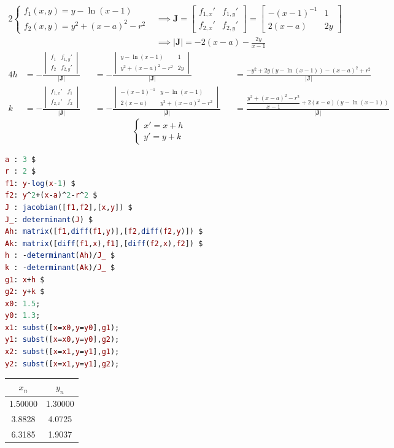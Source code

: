 \begin{alignat*}{2}
	\begin{cases}
		f_1(x,y)=y-\ln(x-1)\\
		f_2(x,y)=y^2+(x-a)^2-r^2
	\end{cases}
	&\implies
	\mathbf{J}=\begin{bmatrix}
  		f_{1,x}' & f_{1,y}'\\
  		f_{2,x}' & f_{2,y}'
	\end{bmatrix}=\begin{bmatrix}
  		-(x-1)^{-1} & 1\\
  		2(x-a)      & 2y
	\end{bmatrix}\\
	&\implies
	|\mathbf{J}|=-2(x-a)-\frac{2y}{x-1}
\end{alignat*}
\begin{alignat*}{4}
	h&=-\frac{
		\begin{vmatrix}
			f_1 & f_{1,y}' \\
			f_2 & f_{2,y}'
		\end{vmatrix}}
		{|\mathbf{J}|}
	   &&=-\frac{
		\begin{vmatrix}
			y-\ln(x-1)      & 1 \\
			y^2+(x-a)^2-r^2 & 2y
		\end{vmatrix}}
		{|\mathbf{J}|}
	   &&=\frac{-y^2+2y(y-\ln(x-1))-(x-a)^2+r^2}{|\mathbf{J}|}\\
	k&=-\frac{
		\begin{vmatrix}
			f_{1,x}' & f_1 \\
			f_{2,x}' & f_2
		\end{vmatrix}}
		{|\mathbf{J}|}
	   &&=-\frac{
		\begin{vmatrix}
			-(x-1)^{-1} & y-\ln(x-1)      \\
			2(x-a)      & y^2+(x-a)^2-r^2
		\end{vmatrix}}
		{|\mathbf{J}|}
	   &&=\frac{\dfrac{y^2+(x-a)^2-r^2}{x-1}+2(x-a)(y-\ln(x-1))}{|\mathbf{J}|}
\end{alignat*}
\begin{equation*}
	\begin{cases}
		x'=x+h\\
		y'=y+k
	\end{cases}
\end{equation*}
\begin{lstlisting}[language=Maxima, caption=Comandos 2012T1-6 (MAXIMA)]
a : 3 $
r : 2 $
f1: y-log(x-1) $
f2: y^2+(x-a)^2-r^2 $
J : jacobian([f1,f2],[x,y]) $
J_: determinant(J) $
Ah: matrix([f1,diff(f1,y)],[f2,diff(f2,y)]) $
Ak: matrix([diff(f1,x),f1],[diff(f2,x),f2]) $
h : -determinant(Ah)/J_ $
k : -determinant(Ak)/J_ $
g1: x+h $
g2: y+k $
x0: 1.5;
y0: 1.3;
x1: subst([x=x0,y=y0],g1);
y1: subst([x=x0,y=y0],g2);
x2: subst([x=x1,y=y1],g1);
y2: subst([x=x1,y=y1],g2);
\end{lstlisting}
\begin{center}
\begin{tabular}{c | c}
	$x_n$   & $y_n$   \\ \hline
	1.50000 & 1.30000 \\
	3.8828  & 4.0725  \\
	6.3185  & 1.9037 
\end{tabular}
\end{center}
